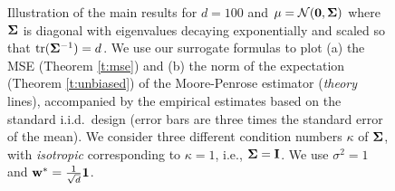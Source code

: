 \documentclass[11pt]{article}
\begin{document}
\begin{figure}[t]
\centering
{}
\hfill
{}
\caption{Illustration of the main results for $d=100$ and
$\mu=\mathcal{N}(\mathbf 0,\mathbf{\Sigma})$ where $\mathbf{\Sigma}$ is diagonal with
eigenvalues decaying exponentially and scaled so that
$\mathrm{tr}(\mathbf{\Sigma}^{-1})=d$. We use our surrogate
formulas to plot (a) the MSE (Theorem \ref{t:mse}) and (b) the norm of the expectation (Theorem
\ref{t:unbiased}) of the Moore-Penrose estimator (\emph{theory}
lines), accompanied by the empirical estimates based on the standard
i.i.d.~design (error bars are three times the standard error of the
mean). We consider three different condition numbers $\kappa$ of
$\mathbf{\Sigma}$, with \emph{isotropic} corresponding to $\kappa=1$,
i.e., $\mathbf{\Sigma}=\mathbf I$. We use $\sigma^2=1$ and
$\mathbf w^*=\frac1{\sqrt{d}}\mathbf 1$.}
\vspace{-5mm}
\label{f:intro}
\end{figure}
\end{document}
